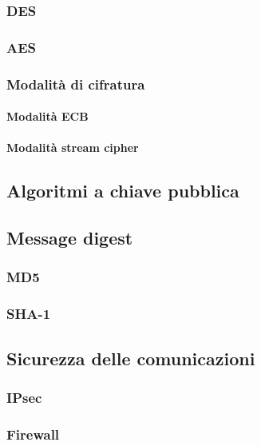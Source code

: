 \subsubsection{DES}

\subsubsection{AES}

\subsubsection{Modalità di cifratura}

\paragraph{Modalità ECB}

\paragraph{Modalità stream cipher}

\subsection{Algoritmi a chiave pubblica} %

\subsection{Message digest} %

\subsubsection{MD5}

\subsubsection{SHA-1}

\subsection{Sicurezza delle comunicazioni} %

\subsubsection{IPsec} %

\subsubsection{Firewall} %

